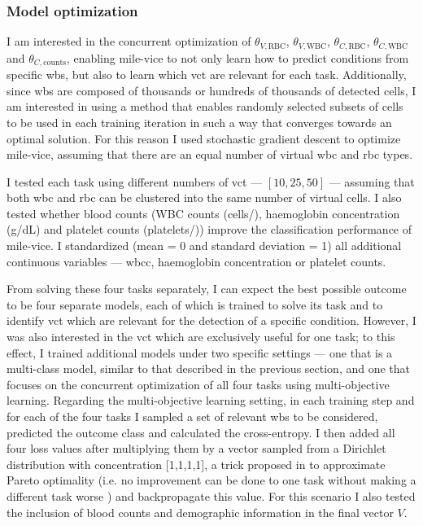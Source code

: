 \subsubsection{Model optimization}

I am interested in the concurrent optimization of $\theta_{V,\mathrm{RBC}}$, $\theta_{V,\mathrm{WBC}}$, $\theta_{C,\mathrm{RBC}}$, $\theta_{C,\mathrm{WBC}}$ and $\theta_{C,\mathrm{counts}}$, enabling \ac{mile-vice} to not only learn how to predict conditions from specific \ac{wbs}, but also to learn which \ac{vct} are relevant for each task. Additionally, since \ac{wbs} are composed of thousands or hundreds of thousands of detected cells, I am interested in using a method that enables randomly selected subsets of cells to be used in each training iteration in such a way that converges towards an optimal solution. For this reason I used stochastic gradient descent to optimize \ac{mile-vice}, assuming that there are an equal number of virtual \ac{wbc} and \ac{rbc} types.

I tested each task using different numbers of \ac{vct} --- $[10, 25, 50]$ --- assuming that both \ac{wbc} and \ac{rbc} can be clustered into the same number of virtual cells. I also tested whether blood counts (WBC counts (cells/\Mum), haemoglobin concentration (g/dL) and platelet counts (platelets/\Mum)) improve the classification performance of \ac{mile-vice}. I standardized (mean = 0 and standard deviation = 1) all additional continuous variables --- \ac{wbcc}, haemoglobin concentration or platelet counts. 

From solving these four tasks separately, I can expect the best possible outcome to be four separate models, each of which is trained to solve its task and to identify \ac{vct} which are relevant for the detection of a specific condition. However, I was also interested in the \ac{vct} which are exclusively useful for one task; to this effect, I trained additional models under two specific settings --- one that is a multi-class model, similar to that described in the previous section, and one that focuses on the concurrent optimization of all four tasks using multi-objective learning. Regarding the multi-objective learning setting, in each training step and for each of the four tasks I sampled a set of relevant \ac{wbs} to be considered, predicted the outcome class and calculated the cross-entropy. I then added all four loss values after multiplying them by a vector sampled from a Dirichlet distribution with concentration [1,1,1,1], a trick proposed in \cite{Ruchte2021-ch} to approximate Pareto optimality (i.e. no improvement can be done to one task without making a different task worse \cite{Censor1977-nd}) and backpropagate this value. For this scenario I also tested the inclusion of blood counts and demographic information in the final vector $V$.

